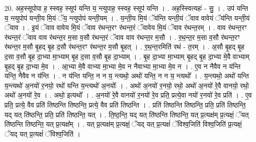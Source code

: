 \documentclass[17pt]{extarticle}
\begin{document}
20. अह॒स्सूपोपा ह॒ स्स्वह॒ स्सूप॑ यन्ति य॒ न्त्युपाह॒ स्स्वह॒ स्सूप॑ यन्ति । . अह॒स्स्वित्यहः॑ - सु॒ । . उप॑ यन्ति य॒ न्त्युपोप॑ यन्ती॒य मि॒यं ॅय॒ न्त्युपोप॑ यन्ती॒यम् । . य॒न्ती॒य मि॒यं ॅय॑न्ति यन्ती॒यं ॅवाव वावेयं ॅय॑न्ति यन्ती॒यं ॅवाव । . इ॒यं ॅवाव वावेय मि॒यं ॅवाव र॑थन्त॒रꣳ र॑थन्त॒रं ॅवावेय मि॒यं ॅवाव र॑थन्त॒रम् । . वाव र॑थन्त॒रꣳ र॑थन्त॒रं ॅवाव वाव र॑थन्त॒र म॒सा व॒सौ र॑थन्त॒रं ॅवाव वाव र॑थन्त॒र म॒सौ । . र॒थ॒न्त॒र म॒सा व॒सौ र॑थन्त॒रꣳ र॑थन्त॒र म॒सौ बृ॒हद् बृ॒ह द॒सौ र॑थन्त॒रꣳ र॑थन्त॒र म॒सौ बृ॒हत् । . र॒थ॒न्त॒रमिति॑ रथं - त॒रम् । . अ॒सौ बृ॒हद् बृ॒ह द॒सा व॒सौ बृ॒ह दा॒भ्या मा॒भ्याम् बृ॒ह द॒सा व॒सौ बृ॒ह दा॒भ्याम् । . बृ॒ह दा॒भ्या मा॒भ्याम् बृ॒हद् बृ॒ह दा॒भ्या मे॒वै वाभ्याम् बृ॒हद् बृ॒ह दा॒भ्या मे॒व । . आ॒भ्या मे॒वै वाभ्या मा॒भ्या मे॒व न नैवाभ्या मा॒भ्या मे॒व न । . ए॒व न नैवैव न य॑न्ति यन्ति॒ नैवैव न य॑न्ति । . न य॑न्ति यन्ति॒ न न य॒ न्त्यथो॒ अथो॑ यन्ति॒ न न य॒ न्त्यथो᳚ । . य॒न्त्यथो॒ अथो॑ यन्ति य॒न्त्यथो॑ अ॒नयो॑ र॒नयो॒ रथो॑ यन्ति य॒न्त्यथो॑ अ॒नयोः᳚ । . अथो॑ अ॒नयो॑ र॒नयो॒ रथो॒ अथो॑ अ॒नयो॑ रे॒वै वानयो॒ रथो॒ अथो॑ अ॒नयो॑ रे॒व । . अथो॒ इत्यथो᳚ । . अ॒नयो॑ रे॒वै वानयो॑ र॒नयो॑ रे॒व प्रति॒ प्रत्ये॒वा नयो॑ र॒नयो॑ रे॒व प्रति॑ । . ए॒व प्रति॒ प्रत्ये॒ वैव प्रति॑ तिष्ठन्ति तिष्ठन्ति॒ प्रत्ये॒ वैव प्रति॑ तिष्ठन्ति । . प्रति॑ तिष्ठन्ति तिष्ठन्ति॒ प्रति॒ प्रति॑ तिष्ठन्ति॒ यद् यत् ति॑ष्ठन्ति॒ प्रति॒ प्रति॑ तिष्ठन्ति॒ यत् । . ति॒ष्ठ॒न्ति॒ यद् यत् ति॑ष्ठन्ति तिष्ठन्ति॒ यत् प्र॒त्यक्ष॑म् प्र॒त्यक्षं॒ ॅयत् ति॑ष्ठन्ति तिष्ठन्ति॒ यत् प्र॒त्यक्ष᳚म् । . यत् प्र॒त्यक्ष॑म् प्र॒त्यक्षं॒ ॅयद् यत् प्र॒त्यक्षं॑ ॅविश्व॒जिति॑ विश्व॒जिति॑ प्र॒त्यक्षं॒ ॅयद् यत् प्र॒त्यक्षं॑ ॅविश्व॒जिति॑ । \newline
\end{document}
